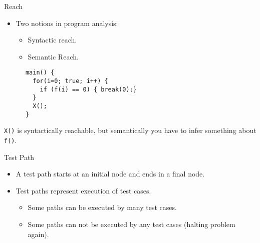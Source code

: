 \documentclass{beamer}
\begin{document}
\begin{frame}[fragile]{Reach}
  \begin{itemize}
  \item Two notions in program analysis:
    \begin{itemize}
    \item Syntactic reach. 
    \item Semantic Reach.
    \end{itemize}
   \end{itemize}
\begin{lstlisting}
      main() {
        for(i=0; true; i++) {
          if (f(i) == 0) { break(0);}
        }
        X();
      }
\end{lstlisting}
{\tt X()}  is syntactically reachable, but
semantically you have to infer something about {\tt f()}.
\end{frame}
\begin{frame}{Test Path}
   \begin{itemize}
   \item  A test path starts at an initial node and ends in a final
     node.
   \item Test paths represent execution of test cases.
     \begin{itemize}
     \item  Some paths can be executed by many test cases.
     \item Some paths can not be executed by any test cases (halting
       problem again).
     \end{itemize}
   \end{itemize}
\end{frame}
\end{document}
